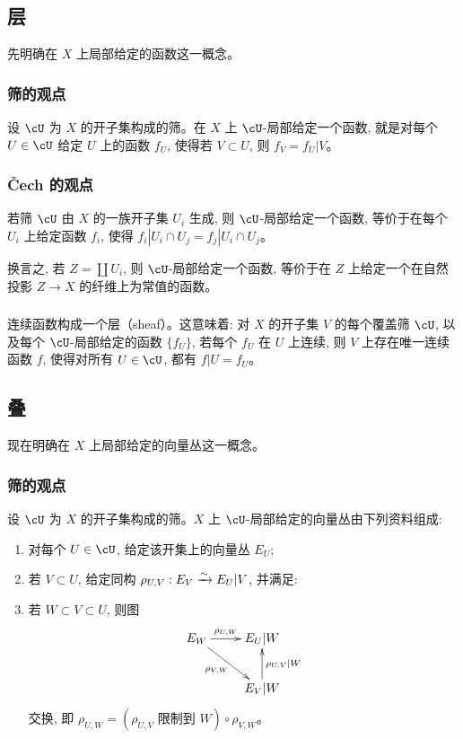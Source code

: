 \subsection{层}\label{I:1-2}

先明确在 $X$ 上局部给定的函数这一概念。

\subsubsection{筛的观点}\label{I:1-2-1}

设 $\cU$ 为 $X$ 的开子集构成的筛。在 $X$ 上 $\cU$-局部给定一个函数, 就是对每个 $U\in \cU$ 给定 $U$ 上的函数 $f_U$, 使得若 $V\subset U$, 则 $f_V=f_U|V$。

\subsubsection{Čech 的观点}\label{I:1-2-2}

若筛 $\cU$ 由 $X$ 的一族开子集 $U_i$ 生成, 则 $\cU$-局部给定一个函数, 等价于在每个 $U_i$ 上给定函数 $f_i$, 使得 $f_i|{U_i\cap U_j} = f_j|{U_i\cap U_j}$。

换言之, 若 $Z=\coprod U_i$, 则 $\cU$-局部给定一个函数, 等价于在 $Z$ 上给定一个在自然投影 $Z\to X$ 的纤维上为常值的函数。

\subsubsection{}\label{I:1-2-3}

连续函数构成一个层（sheaf）。这意味着: 对 $X$ 的开子集 $V$ 的每个覆盖筛 $\cU$, 以及每个 $\cU$-局部给定的函数 $\{f_U\}$, 若每个 $f_U$ 在 $U$ 上连续, 则 $V$ 上存在唯一连续函数 $f$, 使得对所有 $U\in \cU$, 都有 $f|U=f_U$。

\subsection{叠}\label{I:1-3}

现在明确在 $X$ 上局部给定的向量丛这一概念。

\subsubsection{筛的观点}\label{I:1-3-1}

设 $\cU$ 为 $X$ 的开子集构成的筛。$X$ 上 $\cU$-局部给定的向量丛由下列资料组成:
\begin{enumerate}[\indent a)]
  \item 对每个 $U\in \cU$, 给定该开集上的向量丛 $E_U$;
  \item 若 $V\subset U$, 给定同构
    $\rho_{U,V}:E_V\xrightarrow\sim E_U|V$, 并满足:
  \item 若 $W\subset V\subset U$, 则图
    \[\xymatrix{
      E_W \ar[r]^-{\rho_{U,W}} \ar[dr]_-{\rho_{V,W}}
        & E_U|W \\
      & E_V|W \ar[u]_-{\rho_{U,V}|W}
    }\]
    交换, 即
    $\rho_{U,W} = (\mbox{$\rho_{U,V}$ 限制到 $W$}) \circ \rho_{V,W}$。
\end{enumerate}

